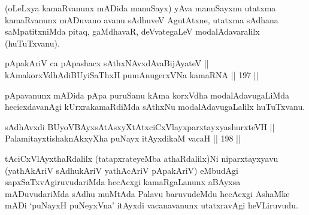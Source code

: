 \begin{artha}
(oLeLxya kamaRvanunx mADida manuSayx) yAva manuSayxnu utatxma
kamaRvanunx mADuvano avanu sAdhuveV AgutAtxne, utatxma sAdhana
saMpatitxniMda pitaq, gaMdhavaR, deVvategaLeV modalAdavaralilx
(huTuTxvanu).
\end{artha}

\begin{shl}
pApakAriV ca pApashacx sAthxNAvxdAvaBijAyateV || \\
kAmakorxVdhAdiBUyiSaThxH pumAnugerxVNa kamaRNA \hfill || 197 ||  
\end{shl}

\begin{artha}
pApavanunx mADida pApa puruSanu kAma korxVdha modalAdavugaLiMda
hecicxdavanAgi kUrxrakamaRdiMda sAthxNu modalAdavugaLalilx huTuTxvanu.
\end{artha}



\begin{shl}
sAdhAvxdi BUyoVBAyxsAtAsxyXtAtxciCxVlayxparxtayxyashurxteVH || \\
PalamitayxtishaknAkxyX\s \s ha puNayx itAyxdikaM vacaH \hfill || 198 ||  
\end{shl}

\begin{artha}
tAciCxVlAyxthaRdalilx (tatapxrateyeMba athaRdalilx)Ni niparxtayxyavu
(yathAkAriV sAdhukAriV yathAcAriV pApakAriV) eMbudAgi
sapxSaTxvAgiruvudariMda hecAcxgi kamaRgaLanunx aBAyxsa mADuvudariMda
sAdhu muMtAda Palavu baruvudeMdu hecAcxgi AshaMke mADi `puNayxH
puNeyxVna' itAyxdi vacanavanunx utatxravAgi heVLiruvudu.
\end{artha}


